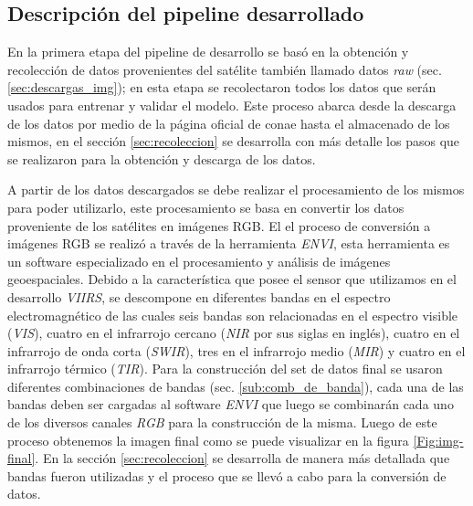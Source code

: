 \newpage
\subsection*{Descripción del pipeline desarrollado}\label{sub:desc-pipeline}

En la primera etapa del pipeline de desarrollo se basó en la obtención y recolección de datos provenientes del satélite también llamado datos \textit{raw} (sec. \ref{sec:descargas_img}); en esta etapa se recolectaron todos los datos que serán usados para entrenar y validar el modelo. Este proceso abarca desde la descarga de los datos por medio de la página oficial de \ac{conae} hasta el almacenado de los mismos, en el sección \ref{sec:recoleccion} se desarrolla con más detalle los pasos que se realizaron para la obtención y descarga de los datos.

A partir de los datos descargados  se debe realizar el procesamiento de los mismos para poder utilizarlo, este procesamiento se basa en convertir los datos proveniente de los satélites en imágenes RGB. El el proceso de conversión a imágenes RGB se realizó a través de la herramienta \textit{ENVI}, esta herramienta es un software  especializado en el procesamiento y análisis de imágenes  geoespaciales. Debido a la característica que posee el sensor que utilizamos en el desarrollo \textit{VIIRS}, se descompone en diferentes bandas en el espectro electromagnético de las cuales seis bandas son relacionadas en el espectro visible (\textit{VIS}), cuatro en el infrarrojo cercano (\textit{NIR} por sus siglas en inglés), cuatro en el infrarrojo de onda corta (\textit{SWIR}), tres en el infrarrojo medio (\textit{MIR}) y cuatro en el infrarrojo térmico (\textit{TIR}). Para la construcción del set de datos final se usaron diferentes combinaciones de bandas (sec. \ref{sub:comb_de_banda}), cada una de las bandas deben ser cargadas al software \textit{ENVI} que luego se combinarán cada uno de los diversos canales \textit{RGB} para la construcción de la misma. Luego de este proceso obtenemos la imagen final como se puede visualizar en la figura \ref{Fig:img-final}. En la sección \ref{sec:recoleccion} se desarrolla de manera más detallada que bandas fueron utilizadas y el proceso que se llevó a cabo para la conversión de datos.

